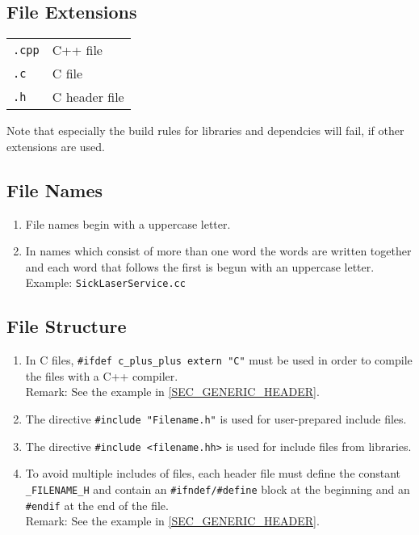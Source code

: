 \subsection{File Extensions}

\begin{tabular}{ll}
  {\tt .cpp}  & C++ file \\
  {\tt .c}   & C file \\
  {\tt .h}   & C header file
\end{tabular}

Note that especially the build rules for libraries and dependcies will
fail, if other extensions are used.


\subsection{File Names}

\begin{enumerate}
\item File names begin with a uppercase letter.
\item In names which consist of more than one word the words are
  written together and each word that follows the first is begun with an
  uppercase letter. \\ 
  Example: {\tt SickLaserService.cc}
\end{enumerate}


\subsection{File Structure}
\label{SEC_FILE_STRUCTURE}

\begin{enumerate}
\item In C files, {\tt \#ifdef c\_plus\_plus extern "C"} must be
  used in order to compile the files with a C++ compiler. \\
  Remark: See the example in \ref{SEC_GENERIC_HEADER}.
\item The directive {\tt \#include "Filename.h"} is used for
  user-prepared include files.
\item The directive {\tt \#include <filename.hh>} is used for
  include files from libraries.
\item To avoid multiple includes of files, each header file must
  define the constant {\tt \_FILENAME\_H} and contain an
  {\tt \#ifndef/\#define} block at the beginning and an
  {\tt \#endif} at the end of the file. \\
  Remark: See the example in \ref{SEC_GENERIC_HEADER}. 
\end{enumerate}


